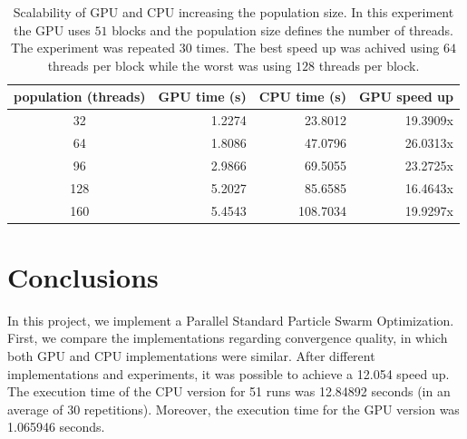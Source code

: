 \documentclass{article}
\begin{document}
    \begin{table}[!htb]
        \centering
        \caption{Scalability of GPU and CPU increasing the population size. In this experiment the GPU uses $51$ blocks and the population size defines the number of threads. The experiment was repeated $30$ times. The best speed up was achived using $64$ threads per block while the worst was using $128$ threads per block.}
        \label{tbl:scalability}
        \begin{tabular}{|c|r|r|r|}
        \hline
        \textbf{population (threads)} & \multicolumn{1}{c|}{\textbf{GPU time (s)}} & \multicolumn{1}{c|}{\textbf{CPU time (s)}} & \multicolumn{1}{c|}{\textbf{GPU speed up}} \\ \hline
        32                       & 1.2274                                     & 23.8012                                    & 19.3909x                                   \\ \hline
        64                       & 1.8086                                     & 47.0796                                    & 26.0313x                                   \\ \hline
        96                       & 2.9866                                     & 69.5055                                    & 23.2725x                                   \\ \hline
        128                      & 5.2027                                     & 85.6585                                    & 16.4643x                                   \\ \hline
        160                      & 5.4543                                     & 108.7034                                   & 19.9297x                                   \\ \hline
        \end{tabular}
    \end{table}


    \section{Conclusions}

    In this project, we implement a Parallel Standard Particle Swarm Optimization.
    First, we compare the implementations regarding convergence quality, in which both GPU and CPU implementations were similar.
    After different implementations and experiments, it was possible to achieve a 12.054 speed up. The execution time of the CPU version for 51 runs was 12.84892 seconds (in an average of 30 repetitions). Moreover, the execution time for the GPU version was 1.065946 seconds.

    
     
\end{document}
